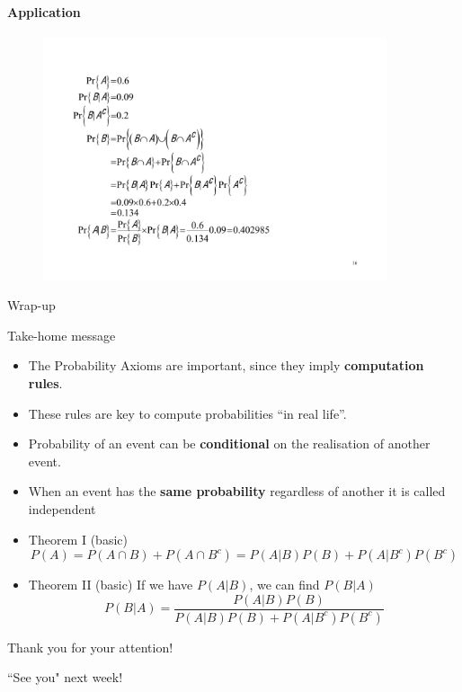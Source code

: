 \documentclass[notes=show,handout]{beamer}\usepackage[]{graphicx}\usepackage[]{color}
\begin{document}
\begin{frame}{\secname}
\framesubtitle{Application}
  \begin{example}[cont'd]
  \begin{figure}[h!]
  \centering
  \includegraphics[width=0.9\textwidth,height=0.65\textheight]{img/example9b.pdf}
  \end{figure}
  \end{example}
\end{frame}


\begin{frame}{Wrap-up}

Take-home message

\begin{itemize}
\item The Probability Axioms are important, since they imply \textbf{computation rules}.
\item These rules are key to compute probabilities ``in real life''.
\item Probability of an event can be \textbf{conditional} on the realisation of another event.
\item When an event has the \textbf{same probability} regardless of another it is called independent
\item Theorem I (basic) $$P(A)=P(A \cap B)+P(A\cap B^c) = P(A\vert B)P(B)+P(A\vert B^c) P(B^c)$$
\item Theorem II (basic) If we have $P(A|B)$, we can find $P(B|A)$
$$P(B|A) = \frac{P(A|B)P(B)}{P(A|B)P(B) + P(A|B^c)P(B^c)}$$
\end{itemize}
\end{frame}

\begin{frame}
	\begin{center}

		\LARGE{Thank you for your attention!}

		\pause

		\LARGE{``See you" next week!}
	\end{center}
\end{frame}
\end{document}
